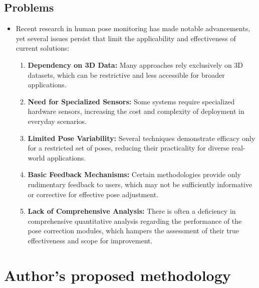 \subsection{Problems}
\begin{itemize}

\item Recent research in human pose monitoring has made notable advancements, yet several issues persist that limit the applicability and effectiveness of current solutions:
\begin{enumerate} 

\item \textbf{Dependency on 3D Data:} Many approaches rely exclusively on 3D datasets, which can be restrictive and less accessible for broader applications.
\item \textbf{Need for Specialized Sensors:} Some systems require specialized hardware sensors, increasing the cost and complexity of deployment in everyday scenarios.
\item \textbf{Limited Pose Variability:} Several techniques demonstrate efficacy only for a restricted set of poses, reducing their practicality for diverse real-world applications.
\item \textbf{Basic Feedback Mechanisms:} Certain methodologies provide only rudimentary feedback to users, which may not be sufficiently informative or corrective for effective pose adjustment.
\item \textbf{Lack of Comprehensive Analysis:} There is often a deficiency in comprehensive quantitative analysis regarding the performance of the pose correction modules, which hampers the assessment of their true effectiveness and scope for improvement.
\end{enumerate}
\end{itemize}
\section{Author's proposed methodology}
